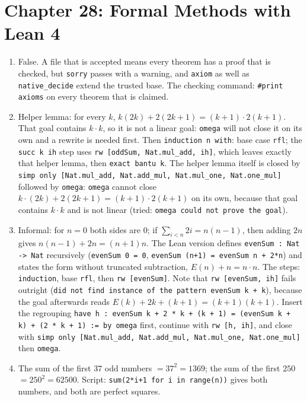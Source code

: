 \section*{Chapter 28: Formal Methods with Lean 4}
\begin{enumerate}[label=\textbf{28.\arabic*}]
  \item False. A file that is accepted means every theorem has a proof that is
        checked, but \texttt{sorry} passes with a warning, and
        \texttt{axiom} as well as \texttt{native\_decide} extend the trusted base.
        The checking command: \texttt{\#print axioms} on every theorem that is
        claimed.

  \item 
Helper lemma: for every $k$, $k(2k)+2(2k+1)=(k+1)\cdot2(k+1)$. That goal
        contains $k\cdot k$, so it is not a linear goal: \texttt{omega} will not
        close it on its own and a rewrite is needed first. Then \texttt{induction n
        with}: base case \texttt{rfl}; the \texttt{succ k ih} step uses \texttt{rw
        [oddSum, Nat.mul\_add, ih]}, which leaves exactly that helper lemma, then
        \texttt{exact bantu k}. The helper lemma itself is closed by
        \texttt{simp only [Nat.mul\_add, Nat.add\_mul, Nat.mul\_one, Nat.one\_mul]}
        followed by \texttt{omega}: \texttt{omega} cannot close
        $k\cdot(2k)+2(2k+1)=(k+1)\cdot2(k+1)$ on its own, because that goal contains
        $k\cdot k$ and is not linear (tried: \texttt{omega could not prove the goal}).

  \item Informal: for $n=0$ both sides are $0$; if $\sum_{i<n}2i=n(n-1)$, then
        adding $2n$ gives $n(n-1)+2n=(n+1)n$. The Lean version defines
        \texttt{evenSum : Nat -> Nat} recursively (\texttt{evenSum 0 = 0},
        \texttt{evenSum (n+1) = evenSum n + 2*n}) and states the form without
        truncated subtraction, $E(n)+n=n\cdot n$. The steps: \texttt{induction},
        base \texttt{rfl}, then \texttt{rw [evenSum]}. Note that
        \texttt{rw [evenSum, ih]} fails outright (\texttt{did not find instance of
        the pattern evenSum k + k}), because the goal afterwards reads
        $E(k)+2k+(k+1)=(k+1)(k+1)$. Insert the regrouping
        \texttt{have h : evenSum k + 2 * k + (k + 1) = (evenSum k + k) + (2 * k + 1) := by omega}
        first, continue with \texttt{rw [h, ih]}, and close with
        \texttt{simp only [Nat.mul\_add, Nat.add\_mul, Nat.mul\_one, Nat.one\_mul]}
        then \texttt{omega}.

  \item The sum of the first $37$ odd numbers $=37^{2}=1369$; the sum of the first $250$
        $=250^{2}=62500$. Script: \texttt{sum(2*i+1 for i in range(n))} gives
        both numbers, and both are perfect squares.


\end{enumerate}
